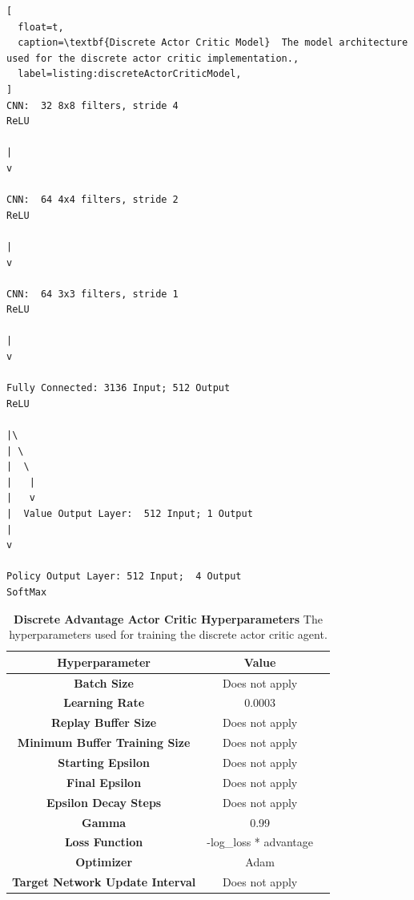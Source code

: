 \documentclass[conference]{IEEEtran}
\begin{document}
\begin{lstlisting}[
  float=t,
  caption=\textbf{Discrete Actor Critic Model}  The model architecture used for the discrete actor critic implementation.,
  label=listing:discreteActorCriticModel,
]
CNN:  32 8x8 filters, stride 4
ReLU

|
v

CNN:  64 4x4 filters, stride 2
ReLU

|
v

CNN:  64 3x3 filters, stride 1
ReLU

|
v

Fully Connected: 3136 Input; 512 Output
ReLU

|\
| \
|  \
|   |
|   v
|  Value Output Layer:  512 Input; 1 Output
|
v

Policy Output Layer: 512 Input;  4 Output
SoftMax
\end{lstlisting}

\begin{table}[htbp]
    \caption{\textbf{Discrete Advantage Actor Critic Hyperparameters}  The hyperparameters used for training the discrete actor critic agent.}
\begin{center}
\begin{tabular}{|c|c|c|}
\hline
\textbf{Hyperparameter} & \textbf{Value} \\
\hline
\textbf{Batch Size} & Does not apply \\
\hline
\textbf{Learning Rate} & 0.0003\\
\hline
\textbf{Replay Buffer Size} & Does not apply \\
\hline
\textbf{Minimum Buffer Training Size} & Does not apply \\
\hline
\textbf{Starting Epsilon} & Does not apply \\
\hline
\textbf{Final Epsilon} & Does not apply \\
\hline
\textbf{Epsilon Decay Steps} & Does not apply \\
\hline
\textbf{Gamma} & 0.99\\
\hline
\textbf{Loss Function} &  -log\_loss * advantage \\
\hline
\textbf{Optimizer} & Adam \\
\hline
\textbf{Target Network Update Interval} & Does not apply \\
\hline
\end{tabular}
\label{table:discreteActorCriticHypers}
\end{center}
\end{table}
\end{document}
